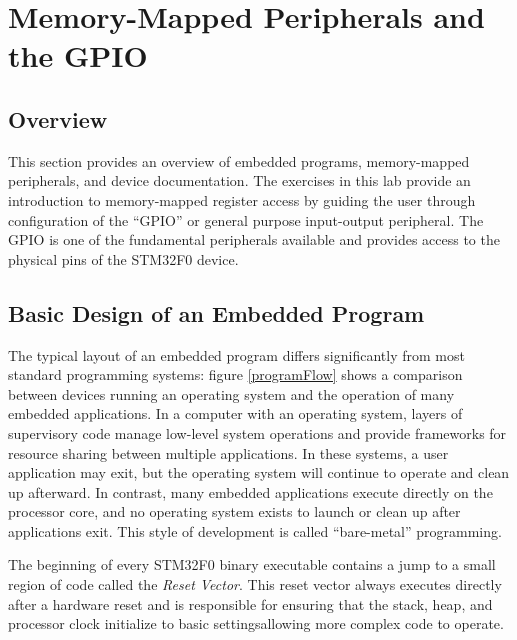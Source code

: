\documentclass[openany,11pt,fleqn]{book} %
\begin{document}
\chapter{Memory-Mapped Peripherals and the GPIO}

\section{Overview}
This section provides an overview of embedded programs, memory-mapped peripherals, and device documentation. The exercises in this lab provide an introduction to memory-mapped register access by guiding the user through configuration of the ``GPIO'' or general purpose input-output peripheral. The GPIO is one of the fundamental peripherals available and provides access to the physical pins of the STM32F0 device. 


\section{\color{orange}Basic Design of an Embedded Program}


The typical layout of an embedded program differs significantly from most standard programming systems: figure \ref{programFlow} shows a comparison between devices running an operating system and the operation of many embedded applications. 
In a computer with an operating system, layers of supervisory code manage low-level system operations and provide frameworks for resource sharing between multiple applications. In these systems, a user application may exit, but the operating system will continue to operate and clean up afterward. In contrast, many embedded applications execute directly on the processor core, and no operating system exists to launch or clean up after applications exit. This style of development is called ``bare-metal'' programming. 

The beginning of every STM32F0 binary executable contains a jump to a small region of code called the \textit{Reset Vector}. This reset vector always executes directly after a hardware reset and is responsible for ensuring that the stack, heap, and processor clock initialize to basic settings\textemdash allowing more complex code to operate.
\end{document}
